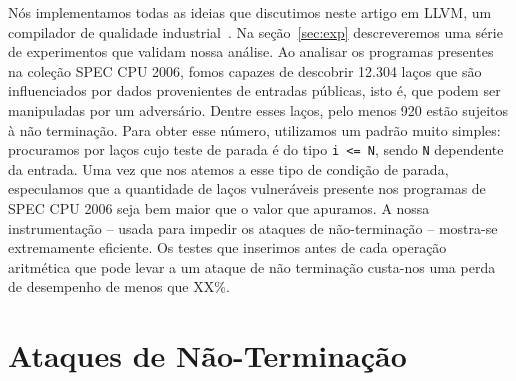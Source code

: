 \documentclass{llncs}
\begin{document}
Nós implementamos todas as ideias que discutimos neste artigo em LLVM,
um compilador de qualidade industrial~\cite{Lattner04}.
Na seção~\ref{sec:exp} descreveremos uma série de experimentos que
validam nossa análise.
Ao analisar os programas presentes na coleção SPEC CPU 2006, fomos capazes
de descobrir 12.304 laços que são influenciados por dados provenientes de
entradas públicas, isto é, que podem ser manipuladas por um adversário.
Dentre esses laços, pelo menos 920 estão sujeitos à não terminação.
Para obter esse número, utilizamos um padrão muito simples: procuramos por
laços cujo teste de parada é do tipo \texttt{i <= N}, sendo \texttt{N}
dependente da entrada.
Uma vez que nos atemos a esse tipo de condição de parada, especulamos que
a quantidade de laços vulneráveis presente nos programas de SPEC CPU 2006
seja bem maior que o valor que apuramos.
A nossa instrumentação -- usada para impedir os ataques de não-terminação --
mostra-se extremamente eficiente.
Os testes que inserimos antes de cada operação aritmética que pode levar a
um ataque de não terminação custa-nos uma perda de desempenho de menos que
XX\%.

\section{Ataques de Não-Terminação}
\label{sec:bkg}
\end{document}
